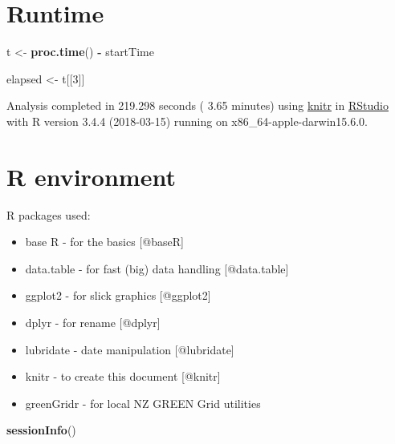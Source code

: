 \documentclass[]{article}
\newenvironment{Shaded}{\begin{snugshade}}{\end{snugshade}}
\newcommand{\KeywordTok}[1]{\textcolor[rgb]{0.13,0.29,0.53}{\textbf{#1}}}
\newcommand{\DecValTok}[1]{\textcolor[rgb]{0.00,0.00,0.81}{#1}}
\newcommand{\StringTok}[1]{\textcolor[rgb]{0.31,0.60,0.02}{#1}}
\newcommand{\OperatorTok}[1]{\textcolor[rgb]{0.81,0.36,0.00}{\textbf{#1}}}
\newcommand{\NormalTok}[1]{#1}
\providecommand{\tightlist}{%
  \setlength{\itemsep}{0pt}\setlength{\parskip}{0pt}}
\begin{document}
\section{Runtime}\label{runtime}

\begin{Shaded}
\begin{Highlighting}[]
\NormalTok{t <-}\StringTok{ }\KeywordTok{proc.time}\NormalTok{() }\OperatorTok{-}\StringTok{ }\NormalTok{startTime}

\NormalTok{elapsed <-}\StringTok{ }\NormalTok{t[[}\DecValTok{3}\NormalTok{]]}
\end{Highlighting}
\end{Shaded}

Analysis completed in 219.298 seconds ( 3.65 minutes) using
\href{https://cran.r-project.org/package=knitr}{knitr} in
\href{http://www.rstudio.com}{RStudio} with R version 3.4.4 (2018-03-15)
running on x86\_64-apple-darwin15.6.0.

\section{R environment}\label{r-environment}

R packages used:

\begin{itemize}
\tightlist
\item
  base R - for the basics {[}@baseR{]}
\item
  data.table - for fast (big) data handling {[}@data.table{]}
\item
  ggplot2 - for slick graphics {[}@ggplot2{]}
\item
  dplyr - for rename {[}@dplyr{]}
\item
  lubridate - date manipulation {[}@lubridate{]}
\item
  knitr - to create this document {[}@knitr{]}
\item
  greenGridr - for local NZ GREEN Grid utilities
\end{itemize}

\begin{Shaded}
\begin{Highlighting}[]
\KeywordTok{sessionInfo}\NormalTok{()}
\end{Highlighting}
\end{Shaded}
\end{document}

